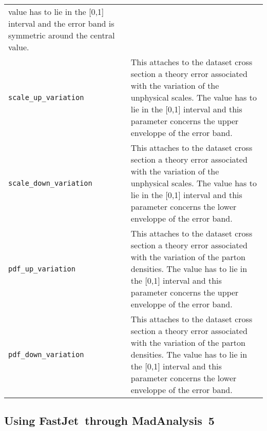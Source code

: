 \documentclass[a4paper]{article}
\newcommand{\MAnorm}{{MadAnalysis}~5}
\newcommand{\FJnorm}{{FastJet}}
\begin{document}
\begin{center}
\begin{tabular}{l p{9.1cm}}
  value has to lie in the [0,1] interval and the error band is symmetric around
  the central value. \\
\color{ao} \verb?scale_up_variation? & This attaches to the dataset cross section
  a theory error associated with the variation of the unphysical scales. The
  value has to lie in the [0,1] interval and this parameter concerns the upper
  enveloppe of the error band.\\
\color{ao} \verb?scale_down_variation? & This attaches to the dataset cross section
  a theory error associated with the variation of the unphysical scales. The
  value has to lie in the [0,1] interval and this parameter concerns the lower
  enveloppe of the error band.\\
\color{ao} \verb?pdf_up_variation? &
  This attaches to the dataset cross section
  a theory error associated with the variation of the parton densities. The
  value has to lie in the [0,1] interval and this parameter concerns the upper
  enveloppe of the error band.\\
\color{ao} \verb?pdf_down_variation? &
  This attaches to the dataset cross section
  a theory error associated with the variation of the parton densities. The
  value has to lie in the [0,1] interval and this parameter concerns the lower
  enveloppe of the error band.\\
\hline
\end{tabular}
\end{center}

\vspace{2cm}

\begin{shaded}
\section{\Large Using \FJnorm\ through \MAnorm}\label{sec:fastjet}
\end{shaded}
\end{document}
